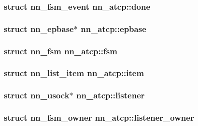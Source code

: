 \subsubsection[{done}]{\setlength{\rightskip}{0pt plus 5cm}struct {\bf nn\+\_\+fsm\+\_\+event} nn\+\_\+atcp\+::done}\hypertarget{structnn__atcp_a4879108dbbc8b71b2bda57a38e41fb4b}{}\label{structnn__atcp_a4879108dbbc8b71b2bda57a38e41fb4b}
\subsubsection[{epbase}]{\setlength{\rightskip}{0pt plus 5cm}struct {\bf nn\+\_\+epbase}$\ast$ nn\+\_\+atcp\+::epbase}\hypertarget{structnn__atcp_ac1a71726a1f8735cb9c053f7f853ccdf}{}\label{structnn__atcp_ac1a71726a1f8735cb9c053f7f853ccdf}
\subsubsection[{fsm}]{\setlength{\rightskip}{0pt plus 5cm}struct {\bf nn\+\_\+fsm} nn\+\_\+atcp\+::fsm}\hypertarget{structnn__atcp_ad04808fad8020edc6f3eb6e3b29cc793}{}\label{structnn__atcp_ad04808fad8020edc6f3eb6e3b29cc793}
\subsubsection[{item}]{\setlength{\rightskip}{0pt plus 5cm}struct {\bf nn\+\_\+list\+\_\+item} nn\+\_\+atcp\+::item}\hypertarget{structnn__atcp_a6fd995526e62b8f65d6848c383b8714c}{}\label{structnn__atcp_a6fd995526e62b8f65d6848c383b8714c}
\subsubsection[{listener}]{\setlength{\rightskip}{0pt plus 5cm}struct {\bf nn\+\_\+usock}$\ast$ nn\+\_\+atcp\+::listener}\hypertarget{structnn__atcp_a9d4cb8ab1d456ad451669a4563b3460d}{}\label{structnn__atcp_a9d4cb8ab1d456ad451669a4563b3460d}
\subsubsection[{listener\+\_\+owner}]{\setlength{\rightskip}{0pt plus 5cm}struct {\bf nn\+\_\+fsm\+\_\+owner} nn\+\_\+atcp\+::listener\+\_\+owner}\hypertarget{structnn__atcp_a78e8bf6c84ec7434898721de359545b7}{}\label{structnn__atcp_a78e8bf6c84ec7434898721de359545b7}
